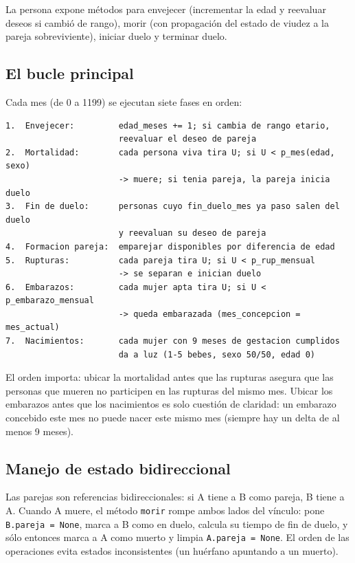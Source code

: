\documentclass[12pt,a4paper]{article}
\begin{document}
La persona expone métodos para envejecer (incrementar la edad y reevaluar deseos si cambió de rango), morir (con propagación del estado de viudez a la pareja sobreviviente), iniciar duelo y terminar duelo.

\subsection{El bucle principal}

Cada mes (de 0 a 1199) se ejecutan siete fases en orden:

\begin{lstlisting}
1.  Envejecer:         edad_meses += 1; si cambia de rango etario,
                       reevaluar el deseo de pareja
2.  Mortalidad:        cada persona viva tira U; si U < p_mes(edad, sexo)
                       -> muere; si tenia pareja, la pareja inicia duelo
3.  Fin de duelo:      personas cuyo fin_duelo_mes ya paso salen del duelo
                       y reevaluan su deseo de pareja
4.  Formacion pareja:  emparejar disponibles por diferencia de edad
5.  Rupturas:          cada pareja tira U; si U < p_rup_mensual
                       -> se separan e inician duelo
6.  Embarazos:         cada mujer apta tira U; si U < p_embarazo_mensual
                       -> queda embarazada (mes_concepcion = mes_actual)
7.  Nacimientos:       cada mujer con 9 meses de gestacion cumplidos
                       da a luz (1-5 bebes, sexo 50/50, edad 0)
\end{lstlisting}

El orden importa: ubicar la mortalidad antes que las rupturas asegura que las personas que mueren no participen en las rupturas del mismo mes. Ubicar los embarazos antes que los nacimientos es solo cuestión de claridad: un embarazo concebido este mes no puede nacer este mismo mes (siempre hay un delta de al menos 9 meses).

\subsection{Manejo de estado bidireccional}

Las parejas son referencias bidireccionales: si A tiene a B como pareja, B tiene a A. Cuando A muere, el método \texttt{morir} rompe ambos lados del vínculo: pone \texttt{B.pareja = None}, marca a B como en duelo, calcula su tiempo de fin de duelo, y sólo entonces marca a A como muerto y limpia \texttt{A.pareja = None}. El orden de las operaciones evita estados inconsistentes (un huérfano apuntando a un muerto).
\end{document}
